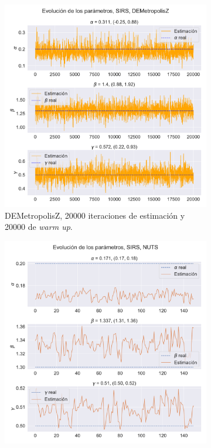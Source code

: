 \begin{figure}[h]
    \centering
    \begin{subfigure}[b]{0.49\linewidth}
        \centering
        \includegraphics[width=\linewidth]{img/content/chapter4/DEMetropolis_sirs_params_trace.pdf}
        \caption{DEMetropolisZ, 20000 iteraciones de estimación y 20000 de \textit{warm up}.}
        \label{fig:DEMetropolisZ_sirs_params_trace}
    \end{subfigure}
    \begin{subfigure}[b]{0.49\linewidth}
        \centering
        \includegraphics[width=\linewidth]{img/content/chapter4/NUTS_sirs_params_trace.pdf}

\end{subfigure}
\end{figure}

